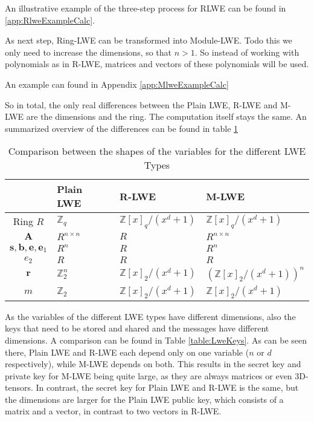An illustrative example of the three-step process for RLWE can be found in \ref{app:RlweExampleCalc}.

As next step, Ring-LWE can be transformed into Module-LWE. Todo this we only need to increase the dimensions, so that $n>1$. So instead of working with polynomials as in R-LWE, matrices and vectors of these polynomials will be used.

An example can found in Appendix \ref{app:MlweExampleCalc}

So in total, the only real differences between the Plain LWE, R-LWE and M-LWE are the dimensions and the ring. The computation itself stays the same. An summarized overview of the differences can be found in table \ref{table:LweDiffs}

\begin{table}[htbp]
  \caption[LWE variables shape comparison]{Comparison between the shapes of the variables for the different LWE Types}
  \label{table:LweDiffs}
  \centering
  \begin{tabular}{|c|l|l|l|}
    \hline
                                                    & Plain LWE        & R-LWE                     & M-LWE                         \\
    \hline
    Ring $R$                                        & $\mathbb{Z}_q$   & $\mathbb{Z}[x]_q/(x^d+1)$ & $\mathbb{Z}[x]_q/(x^d+1)$     \\
    $\textbf{A}$                                    & $R^{n\times n}$  & $R$                       & $R^{n\times n}$               \\
    $\textbf{s},\textbf{b},\textbf{e},\textbf{e}_1$ & $R^{n}$          & $R$                       & $R^{n}$                       \\
    $e_2$                                           & $R$              & $R$                       & $R$                           \\
    $\textbf{r}$                                    & $\mathbb{Z}_2^n$ & $\mathbb{Z}[x]_2/(x^d+1)$ & $(\mathbb{Z}[x]_2/(x^d+1))^n$ \\
    $m$                                             & $\mathbb{Z}_2$   & $\mathbb{Z}[x]_2/(x^d+1)$ & $\mathbb{Z}[x]_2/(x^d+1)$     \\
    \hline
  \end{tabular}
\end{table}

As the variables of the different LWE types have different dimensions, also the keys that need to be stored and shared and the messages have different dimensions. A comparison can be found in Table \ref{table:LweKeys}. As can be seen there, Plain LWE and R-LWE each depend only on one variable ($n$ or $d$ respectively), while M-LWE depends on both. This results in the secret key and private key for M-LWE being quite large, as they are always matrices or even 3D-tensors. In contrast, the secret key for Plain LWE and R-LWE is the same, but the dimensions are larger for the Plain LWE public key, which consists of a matrix and a vector, in contrast to two vectors in R-LWE.

